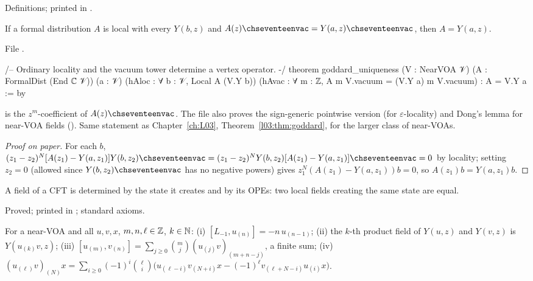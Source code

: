 \begin{status}
Definitions; printed in .
\end{status}

\begin{theorem}\label{ch17:thm:goddard}
If a formal distribution $A$ is local with every $Y(b,z)$ and $A(z)\chseventeenvac=Y(a,z)\chseventeenvac$, then $A=Y(a,z)$.
\end{theorem}

\noindent File .
\begin{leancode}
/-- Ordinary locality and the vacuum tower determine a vertex operator. -/
theorem goddard_uniqueness (V : NearVOA 𝒱) (A : FormalDist (End ℂ 𝒱)) (a : 𝒱)
    (hAloc : ∀ b : 𝒱, Local A (V.Y b))
    (hAvac : ∀ m : ℤ, A m V.vacuum = (V.Y a) m V.vacuum) : A = V.Y a := by
\end{leancode}

\begin{dictionary}
 is the $z^m$-coefficient of $A(z)\chseventeenvac$.  The file also proves the sign-generic pointwise version
 (for $\varepsilon$-locality) and Dong's lemma for near-VOA fields ().
Same statement as Chapter~\ref{ch:L03}, Theorem~\ref{l03:thm:goddard}, for the larger class of near-VOAs.
\end{dictionary}

\begin{proof}[Proof on paper]
For each $b$, $(z_1-z_2)^N[A(z_1)-Y(a,z_1)]Y(b,z_2)\chseventeenvac=(z_1-z_2)^NY(b,z_2)[A(z_1)-Y(a,z_1)]\chseventeenvac=0$ by locality; setting
$z_2=0$ (allowed since $Y(b,z_2)\chseventeenvac$ has no negative powers) gives $z_1^N(A(z_1)-Y(a,z_1))b=0$, so
$A(z_1)b=Y(a,z_1)b$.
\end{proof}

\begin{physics}
A field of a CFT is determined by the state it creates and by its OPEs: two local fields creating the same state are
equal.
\end{physics}

\begin{status}
Proved; printed in ; standard axioms.
\end{status}

\begin{theorem}\label{ch17:thm:nearbasic}
For a near-VOA and all $u,v,x$, $m,n,\ell\in{\mathbb{Z}}$, $k\in{\mathbb{N}}$:
(i) $[L_{-1},u_{(n)}]=-n\,u_{(n-1)}$;
(ii) the $k$-th product field of $Y(u,z)$ and $Y(v,z)$ is $Y(u_{(k)}v,z)$;
(iii) $[u_{(m)},v_{(n)}]=\sum_{j\ge0}\binom mj(u_{(j)}v)_{(m+n-j)}$, a finite sum;
(iv) $(u_{(\ell)}v)_{(N)}x=\sum_{i\ge0}(-1)^i\binom\ell i\bigl(u_{(\ell-i)}v_{(N+i)}x-(-1)^\ell v_{(\ell+N-i)}u_{(i)}x\bigr)$.
\end{theorem}

